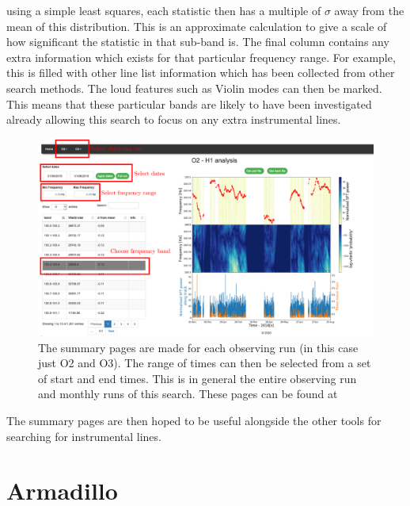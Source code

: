 using a simple least squares, each statistic then has a multiple of $\sigma$
away from the mean of this distribution.  This is an approximate calculation to
give a scale of how significant the statistic in that sub-band is.  The final
column contains any extra information which exists for that particular
frequency range.  For example, this is filled with other line list information
which has been collected from other search methods.  The loud features such as
Violin modes can then be marked. This means that these particular bands are
likely to have been investigated already allowing this search to focus on any
extra instrumental lines.~



\begin{figure}
	\centering
	\includegraphics[width=\textwidth]{C5_detchar/summary_annot.pdf}
	\caption[Example summary page for SOAP search]{The summary pages are made for each observing run (in this case just O2 and O3). The range of times can then be selected from a set of start and end times. This is in general the entire observing run and monthly runs of this search. These pages can be found at \citep{bayleyHome}}
	\label{detchar:summary:plots}
\end{figure}

The summary pages are then hoped to be useful alongside the other tools for
searching for instrumental lines. ~


\clearpage

\section{Armadillo}

